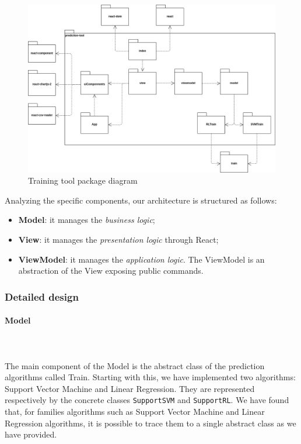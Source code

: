 \begin{figure}[H]
\centering
\includegraphics[scale=0.4]{../../../Diagrams/Package_diagrams/tool_design_patern.png}
\caption{Training tool package diagram}
\end{figure}

Analyzing the specific components, our architecture is structured as follows:
\begin{itemize}
\item \textbf{Model}: it manages the \textit{business logic};
\item \textbf{View}: it manages the \textit{presentation logic} through React;
\item \textbf{ViewModel}: it manages the \textit{application logic}\glo. The ViewModel is an abstraction of the View exposing public commands.
\end{itemize}

\subsubsection{Detailed design}

\paragraph{Model}\mbox{} \\ \mbox{} \\
The main component of the Model is the abstract class of the prediction algorithms called Train. Starting with this, we have implemented
two algorithms: Support Vector Machine and Linear Regression.
They are represented respectively by the concrete classes \texttt{SupportSVM}
and \texttt{SupportRL}. We have found that, for families algorithms such as Support Vector Machine and Linear Regression algorithms, it is possible to trace them to a single abstract class as we have provided. 

